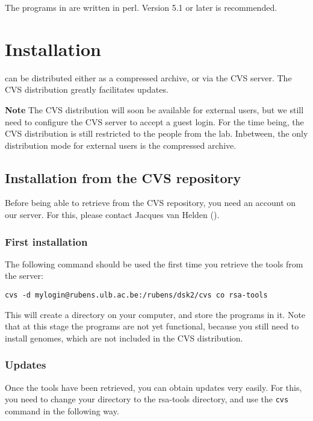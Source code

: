 \documentclass{article}
\begin{document}
The programs in \RSAT are written in perl. Version 5.1 or
later is recommended.


\section{Installation}

\RSAT can be distributed either as a compressed archive, or via the CVS
server. The CVS distribution greatly facilitates updates.

\textbf{Note} The CVS distribution will soon be available for external
users, but we still need to configure the CVS server to accept a guest
login. For the time being, the CVS distribution is still restricted to
the people from the lab. Inbetween, the only distribution mode for
external users is the compressed archive.

\subsection{Installation from the CVS repository}


Before being able to retrieve \RSAT from the CVS repository, you need
an account on our server. For this, please contact Jacques van Helden
().

\subsubsection{First installation}

The following command should be used the first time you retrieve the
tools from the server:
\begin{verbatim}
cvs -d mylogin@rubens.ulb.ac.be:/rubens/dsk2/cvs co rsa-tools
\end{verbatim}

This will create a directory  on your computer, and
store the programs in it. Note that at this stage the programs are not
yet functional, because you still need to install genomes, which are
not included in the CVS distribution.

\subsubsection{Updates}

Once the tools have been retrieved, you can obtain updates very
easily. For this, you need to change your directory to the rsa-tools
directory, and use the \texttt{cvs} command in the following way.
\end{document}
